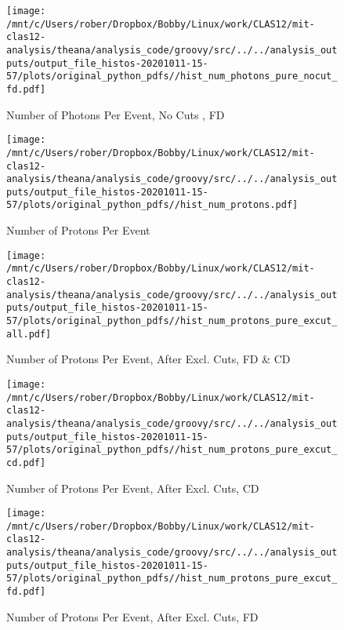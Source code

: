 \documentclass{article}
\begin{document}
\begin{landscape}
\begin{figure}[h]
        \texttt{[image: /mnt/c/Users/rober/Dropbox/Bobby/Linux/work/CLAS12/mit-clas12-analysis/theana/analysis\_code/groovy/src/../../analysis\_outputs/output\_file\_histos-20201011-15-57/plots/original\_python\_pdfs//hist\_num\_photons\_pure\_nocut\_fd.pdf]}
        \captionsetup{textformat=empty,labelformat=blank}
        \caption{Number of Photons Per Event, No Cuts , FD}
    \end{figure}
    \clearpage
    
    \begin{figure}[h]
        \centering

        \texttt{[image: /mnt/c/Users/rober/Dropbox/Bobby/Linux/work/CLAS12/mit-clas12-analysis/theana/analysis\_code/groovy/src/../../analysis\_outputs/output\_file\_histos-20201011-15-57/plots/original\_python\_pdfs//hist\_num\_protons.pdf]}
        \captionsetup{textformat=empty,labelformat=blank}
        \caption{Number of Protons Per Event}
    \end{figure}
    \clearpage
    
    \begin{figure}[h]
        \centering

        \texttt{[image: /mnt/c/Users/rober/Dropbox/Bobby/Linux/work/CLAS12/mit-clas12-analysis/theana/analysis\_code/groovy/src/../../analysis\_outputs/output\_file\_histos-20201011-15-57/plots/original\_python\_pdfs//hist\_num\_protons\_pure\_excut\_all.pdf]}
        \captionsetup{textformat=empty,labelformat=blank}
        \caption{Number of Protons Per Event, After Excl. Cuts, FD \& CD}
    \end{figure}
    \clearpage
    
    \begin{figure}[h]
        \centering

        \texttt{[image: /mnt/c/Users/rober/Dropbox/Bobby/Linux/work/CLAS12/mit-clas12-analysis/theana/analysis\_code/groovy/src/../../analysis\_outputs/output\_file\_histos-20201011-15-57/plots/original\_python\_pdfs//hist\_num\_protons\_pure\_excut\_cd.pdf]}
        \captionsetup{textformat=empty,labelformat=blank}
        \caption{Number of Protons Per Event, After Excl. Cuts, CD}
    \end{figure}
    \clearpage
    
    \begin{figure}[h]
        \centering

        \texttt{[image: /mnt/c/Users/rober/Dropbox/Bobby/Linux/work/CLAS12/mit-clas12-analysis/theana/analysis\_code/groovy/src/../../analysis\_outputs/output\_file\_histos-20201011-15-57/plots/original\_python\_pdfs//hist\_num\_protons\_pure\_excut\_fd.pdf]}
        \captionsetup{textformat=empty,labelformat=blank}
        \caption{Number of Protons Per Event, After Excl. Cuts, FD}
    \end{figure}
    \clearpage
    

\end{landscape}
\end{document}
